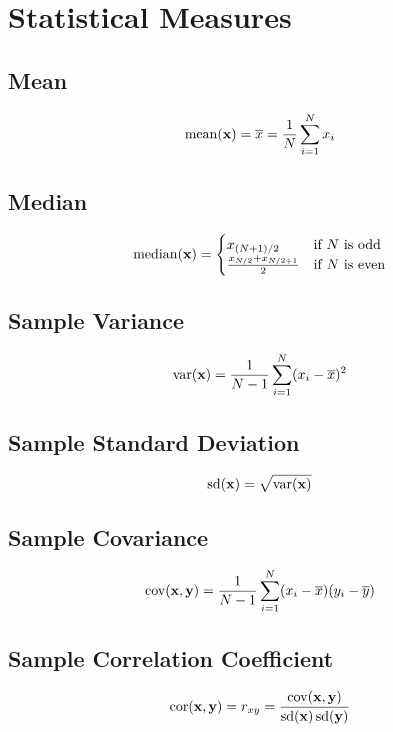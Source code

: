 \documentclass[../../dsa1101_notes.Rtex]{subfiles}\usepackage[]{graphicx}\usepackage[]{color}
\begin{document}
\section{Statistical Measures}
\subsection{Mean}
\[\operatorname{mean}(\textbf{x}) = \overline{x} = \frac{1}{N} \sum_{i=1}^N x_i\]

\subsection{Median}
\[\operatorname{median}(\textbf{x}) = \begin{cases}
	x_{(N+1)/2} & \text{if } N \text{ is odd} \\
	\frac{x_{N/2} + x_{N/2+1}}{2} & \text{if } N \text{ is even} \\
\end{cases}\]

\subsection{Sample Variance}
\[\operatorname{var}(\textbf{x}) = \frac{1}{N-1} \sum_{i=1}^N (x_i - \overline{x})^2\]

\subsection{Sample Standard Deviation}
\[\operatorname{sd}(\textbf{x}) = \sqrt{\operatorname{var}(\textbf{x})}\]

\subsection{Sample Covariance}
\[\operatorname{cov}(\textbf{x}, \textbf{y}) = \frac{1}{N-1} \sum_{i=1}^N (x_i-\overline{x})(y_i-\overline{y})\]

\subsection{Sample Correlation Coefficient}
\[\operatorname{cor}(\textbf{x}, \textbf{y}) = r_{xy} = \frac{\operatorname{cov}(\textbf{x}, \textbf{y})}{\operatorname{sd}(\textbf{x})\operatorname{sd}(\textbf{y})}\]
\end{document}

